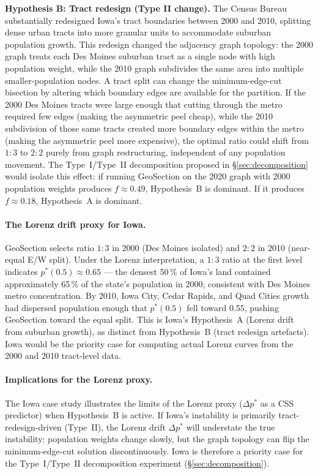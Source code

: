 \textbf{Hypothesis B: Tract redesign (Type II change).}
The Census Bureau substantially redesigned Iowa's tract boundaries between 2000
and 2010, splitting dense urban tracts into more granular units to accommodate
suburban population growth.
This redesign changed the adjacency graph topology: the 2000 graph treats
each Des Moines suburban tract as a single node with high population weight,
while the 2010 graph subdivides the same area into multiple smaller-population
nodes.
A tract split can change the minimum-edge-cut bisection by altering which
boundary edges are available for the partition.
If the 2000 Des Moines tracts were large enough that cutting through the
metro required few edges (making the asymmetric peel cheap), while the 2010
subdivision of those same tracts created more boundary edges within the metro
(making the asymmetric peel more expensive), the optimal ratio could shift
from $1:3$ to $2:2$ purely from graph restructuring, independent of any
population movement.
The Type~I/Type~II decomposition proposed in \S\ref{sec:decomposition}
would isolate this effect: if running GeoSection on the 2020 graph with
2000 population weights produces $f \approx 0.49$, Hypothesis~B is dominant.
If it produces $f \approx 0.18$, Hypothesis~A is dominant.

\paragraph{The Lorenz drift proxy for Iowa.}
GeoSection selects ratio $1:3$ in 2000 (Des Moines isolated) and $2:2$ in
2010 (near-equal E/W split).
Under the Lorenz interpretation, a $1:3$ ratio at the first level indicates
$p^*(0.5) \approx 0.65$ --- the densest 50\,\% of Iowa's land contained
approximately 65\,\% of the state's population in 2000, consistent with
Des Moines metro concentration.
By 2010, Iowa City, Cedar Rapids, and Quad Cities growth had dispersed
population enough that $p^*(0.5)$ fell toward 0.55, pushing GeoSection
toward the equal split.
This is Iowa's Hypothesis~A (Lorenz drift from suburban growth), as distinct
from Hypothesis~B (tract redesign artefacts).
Iowa would be the priority case for computing actual Lorenz curves from the
2000 and 2010 tract-level data.

\paragraph{Implications for the Lorenz proxy.}
The Iowa case study illustrates the limits of the Lorenz proxy
($\Delta p^*$ as a CSS predictor) when Hypothesis~B is active.
If Iowa's instability is primarily tract-redesign-driven (Type~II), the
Lorenz drift $\Delta p^*$ will understate the true instability: population
weights change slowly, but the graph topology can flip the minimum-edge-cut
solution discontinuously.
Iowa is therefore a priority case for the Type~I/Type~II decomposition
experiment (\S\ref{sec:decomposition}).

